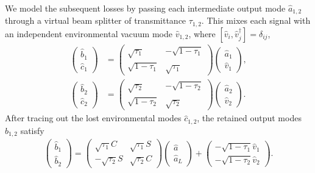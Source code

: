 \documentclass[%
final, 
superscriptaddress,
 amsmath,amssymb,amsfonts,
 aps,
 pra,
 longbibliography,
]{revtex4-2}
\begin{document}
We model the subsequent losses by passing each intermediate output mode $\hat{a}_{1,2}$ through a virtual beam splitter of transmittance $\tau_{1,2}$. This mixes each signal with an independent environmental vacuum mode $\hat{v}_{1,2}$, where $[\hat{v}_i, \hat{v}_j^\dag] = \delta_{ij}$,
\begin{align}
    \begin{pmatrix}
        \hat b_{1}\\
        \hat c_{1}
    \end{pmatrix}&=
    \begin{pmatrix}
        \sqrt{\tau_1}&-\sqrt{1-\tau_1}\\\sqrt{1-\tau_1}&\sqrt{\tau_1}
    \end{pmatrix}
    \begin{pmatrix}
        \hat a_1\\
        \hat v_1
    \end{pmatrix},\\
    \begin{pmatrix}
        \hat b_{2}\\
        \hat c_{2}
    \end{pmatrix}&=
    \begin{pmatrix}
        \sqrt{\tau_2}&-\sqrt{1-\tau_2}\\\sqrt{1-\tau_2}&\sqrt{\tau_2}
    \end{pmatrix}
    \begin{pmatrix}
        \hat a_2\\
        \hat v_2
    \end{pmatrix}.
\end{align}
After tracing out the lost environmental modes $\hat{c}_{1,2}$, the retained output modes $\hat{b}_{1,2}$ satisfy
\begin{align}
    \label{eq:b1b2-out}
    \begin{pmatrix}
        \hat b_{1}\\
        \hat b_{2}
    \end{pmatrix}
    =
    \begin{pmatrix}
        \sqrt{\tau_1}C & \sqrt{\tau_1}S\\
        -\sqrt{\tau_2}S & \sqrt{\tau_2}C
    \end{pmatrix}
    \begin{pmatrix}
        \hat{a}\\
        \hat{a}_L
    \end{pmatrix}
    +
    \begin{pmatrix}
        -\sqrt{1-\tau_1}\hat{v}_1\\
        -\sqrt{1-\tau_2}\hat{v}_2
    \end{pmatrix}.
\end{align}
\end{document}
